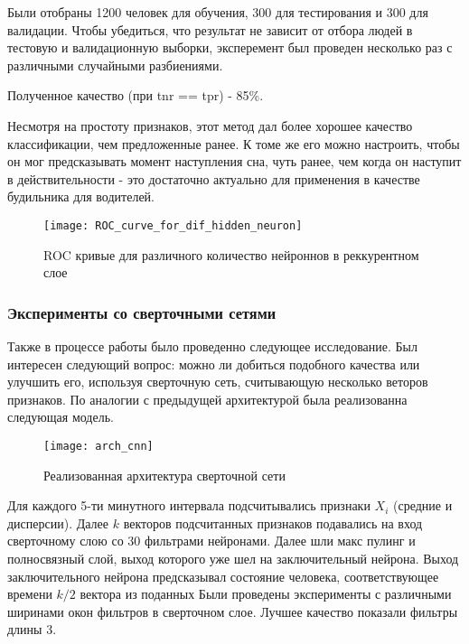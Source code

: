 Были отобраны 1200 человек для обучения, 300 для тестирования и 300 для валидации. 
Чтобы убедиться, что результат не зависит от отбора людей в тестовую и валидационную выборки, эксперемент был проведен несколько раз с различными случайными разбиениями.

Полученное качество (при tnr == tpr) - 85\%. 

Несмотря на простоту признаков, этот метод дал более хорошее качество классификации, чем предложенные ранее. К томе же его можно настроить, чтобы он мог предсказывать момент наступления сна, чуть ранее, чем когда он наступит в действительности - это достаточно актуально для применения в качестве будильника для водителей.

\begin{figure}[h!]
	\begin{center}
		\texttt{[image: ROC\_curve\_for\_dif\_hidden\_neuron]}
		\caption{ROC кривые для различного количество нейроннов в реккурентном слое}
		\label{ris:roc_rnn}
	\end{center}
\end{figure}

\subsubsection{Эксперименты со сверточными сетями}

Также в процессе работы было проведенно следующее исследование. Был интересен следующий вопрос: можно ли добиться подобного качества или улучшить его, используя сверточную сеть, считывающую несколько веторов признаков. По аналогии с предыдущей архитектурой была реализованна следующая модель.  

\begin{figure}[h!]
	\begin{center}
		\texttt{[image: arch\_cnn]}
		\caption{Реализованная архитектура сверточной сети}
		\label{ris:arh_cnn}
	\end{center}
\end{figure}

Для каждого 5-ти минутного интервала подсчитывались признаки $X_i$ (средние и дисперсии). Далее $k$ векторов подсчитанных признаков подавались на вход сверточному слою со 30 фильтрами нейронами. Далее шли макс пулинг и полносвязный слой, выход которого уже шел на заключительный нейрона. Выход заключительного нейрона предсказывал состояние человека, соответствующее времени $k/2$ вектора из поданных Были проведены эксперименты с различными ширинами окон фильтров в сверточном слое. Лучшее качество показали фильтры длины 3.

